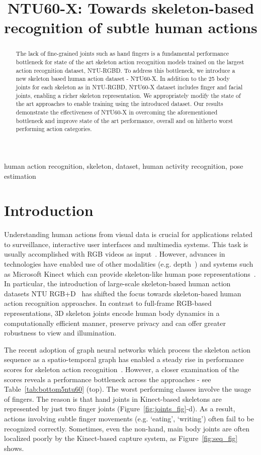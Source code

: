 \documentclass{article}
\title{NTU60-X: Towards skeleton-based recognition of subtle human actions}
\begin{document}
\maketitle

\begin{abstract}
The lack of fine-grained joints such as hand fingers is a fundamental performance bottleneck for state of the art skeleton action recognition models trained on the largest action recognition dataset, NTU-RGBD. To address this bottleneck, we introduce a new skeleton based human action dataset - NTU60-X. In addition to the 25 body joints for each skeleton as in NTU-RGBD, NTU60-X dataset includes finger and facial joints, enabling a richer skeleton representation. We appropriately modify the state of the art approaches to enable training using the introduced dataset. Our results demonstrate the effectiveness of NTU60-X in overcoming the aforementioned bottleneck and improve state of the art performance, overall and on hitherto worst performing action categories.
\end{abstract}
\begin{keywords}
human action recognition, skeleton, dataset, human activity recognition, pose estimation
\end{keywords}
\section{Introduction}

Understanding human actions from visual data is crucial for applications related to surveillance, interactive user interfaces and multimedia systems. This task is usually accomplished with RGB videos as input~\cite{Poppe_IV_2010}. However, advances in technologies have enabled use of other modalities (e.g. depth~\cite{wang2012mining}) and systems such as Microsoft Kinect which can provide skeleton-like human pose representations~\cite{ren2020survey}. In particular, the introduction of large-scale skeleton-based human action datasets NTU RGB+D~\cite{Shahroudy_2016_CVPR,Liu_2019_NTURGBD120} has shifted the focus towards skeleton-based human action recognition approaches. In contrast to full-frame RGB-based representations, 3D skeleton joints encode human body dynamics in a computationally efficient manner, preserve privacy and can offer greater robustness to view and illumination.

The recent adoption of graph neural networks which process the skeleton action sequence as a  spatio-temporal graph has enabled a steady rise in performance scores for skeleton action recognition~\cite{stgcn2018aaai,liu2020disentangling,cheng2020shiftgcn,song2020stronger}. However, a closer examination of the scores reveals a performance bottleneck across the approaches - see Table~\ref{tab:bottom5ntu60} (top). The worst performing classes involve the usage of fingers. The reason is that hand joints in Kinect-based skeletons are represented by just two finger joints (Figure~\ref{fig:joints_fig}-d). As a result, actions involving subtle finger movements (e.g. `eating', `writing') often fail to be recognized correctly. Sometimes, even the non-hand, main body joints are often localized poorly by the Kinect-based capture system, as Figure~\ref{fig:seq_fig} shows.
\end{document}
